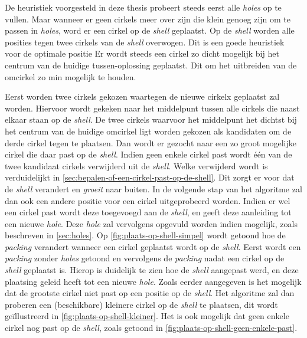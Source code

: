 \documentclass[12pt,a4paper,oneside]{book}
\begin{document}
{De heuristiek voorgesteld in deze thesis probeert steeds eerst alle \textit{holes} op te vullen.
Maar wanneer er geen cirkels meer over zijn die klein genoeg zijn om te passen in \textit{holes}, word er een cirkel op de \textit{shell} geplaatst.
Op de \textit{shell} worden alle posities tegen twee cirkels van de \textit{shell} overwogen.
Dit is een goede heuristiek voor de optimale positie %
Er wordt steeds een cirkel zo dicht mogelijk bij het centrum van de huidige tussen-oplossing geplaatst.
Dit om het uitbreiden van de omcirkel zo min mogelijk te houden.

Eerst worden twee cirkels gekozen waartegen de nieuwe cirkelx geplaatst zal worden.
Hiervoor wordt gekeken naar het middelpunt tussen alle cirkels die naast elkaar staan op de \textit{shell}.
De twee cirkels waarvoor het middelpunt het dichtst bij het centrum van de huidige omcirkel ligt worden gekozen als kandidaten om de derde cirkel tegen te plaatsen.
Dan wordt er gezocht naar een zo groot mogelijke cirkel die daar past op de \textit{shell}.
Indien geen enkele cirkel past wordt één van de twee kandidaat cirkels verwijderd uit de \textit{shell}.
Welke verwijderd wordt is verduidelijkt in \autoref{sec:bepalen-of-een-cirkel-past-op-de-shell}.
Dit zorgt er voor dat de \textit{shell} verandert en \textit{groeit} naar buiten.
In de volgende stap van het algoritme zal dan ook een andere positie voor een cirkel uitgeprobeerd worden.
Indien er wel een cirkel past wordt deze toegevoegd aan de \textit{shell}, en geeft deze aanleiding tot een nieuwe \textit{hole}.
Deze \textit{hole} zal vervolgens opgevuld worden indien mogelijk, zoals beschreven in \autoref{sec:holes}.
Op \autoref{fig:plaats-op-shell-simpel} wordt getoond hoe de \textit{packing} verandert wanneer een cirkel geplaatst wordt op de \textit{shell}.
Eerst wordt een \textit{packing} zonder \textit{holes} getoond en vervolgens de \textit{packing} nadat een cirkel op de \textit{shell} geplaatst is.
Hierop is duidelijk te zien hoe de \textit{shell} aangepast werd, en deze plaatsing geleid heeft tot een nieuwe \textit{hole}.
Zoals eerder aangegeven is het mogelijk dat de grootste cirkel niet past op een positie op de \textit{shell}.
Het algoritme zal dan proberen een (beschikbare) kleinere cirkel op de \textit{shell} te plaatsen, dit wordt geïllustreerd in \autoref{fig:plaats-op-shell-kleiner}.
Het is ook mogelijk dat geen enkele cirkel nog past op de \textit{shell}, zoals getoond in \autoref{fig:plaats-op-shell-geen-enkele-past}. %

}
\end{document}
